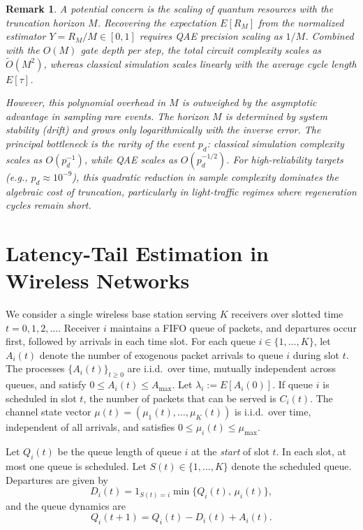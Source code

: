 \documentclass[11pt]{article}
\newcommand{\E}{E}
\newtheorem{remark}{Remark}
\begin{document}
\begin{remark}
A potential concern is the scaling of quantum resources with the truncation horizon $M$. Recovering the expectation $E[R_M]$ from the normalized estimator $Y=R_M/M \in [0,1]$ requires QAE precision scaling as $1/M$. Combined with the $O(M)$ gate depth per step, the total circuit complexity scales as $\tilde{O}(M^2)$, whereas classical simulation scales linearly with the average cycle length $E[\tau]$.

However, this polynomial overhead in $M$ is outweighed by the asymptotic advantage in sampling rare events. The horizon $M$ is determined by system stability (drift) and grows only logarithmically with the inverse error. The principal bottleneck is the rarity of the event $p_d$: classical simulation complexity scales as $O(p_d^{-1})$, while QAE scales as $O(p_d^{-1/2})$. For high-reliability targets (e.g., $p_d \approx 10^{-9}$), this quadratic reduction in sample complexity dominates the algebraic cost of truncation, particularly in light-traffic regimes where regeneration cycles remain short.
\end{remark}



\section{Latency-Tail Estimation in Wireless Networks}\label{sec:wireless}

We consider a single wireless base station serving $K$ receivers over slotted time
$t=0,1,2,\dots$.
Receiver $i$ maintains a FIFO queue of packets, and departures occur first,
followed by arrivals in each time slot.
For each queue $i\in\{1,\dots,K\}$, let $A_i(t)$ denote the number
of exogenous packet arrivals to queue $i$ during slot $t$.
The processes $\{A_i(t)\}_{t\ge 0}$ are i.i.d.\ over time, mutually independent across
queues, and satisfy
$
0 \le A_i(t) \le A_{\max}.
$
Let $\lambda_i := \E[A_i(0)]$.
If queue $i$ is scheduled in slot $t$, the number of packets that can be served is
$C_i(t)$.
The channel state vector $\mu(t)=(\mu_1(t),\dots,\mu_K(t))$ is i.i.d.\ over time,
independent of all arrivals, and satisfies
$
0 \le \mu_i(t) \le \mu_{\max}.
$

Let $Q_i(t)$ be the queue length of queue $i$ at the \emph{start} of slot $t$.
In each slot, at most one queue is scheduled.
Let $S(t)\in\{1,\dots,K\}$ denote the scheduled queue.
Departures are given by
\[
D_i(t)
=
1_{S(t)=i}\min\{Q_i(t),\,\mu_i(t)\},
\]
and the queue dynamics are
\[
Q_i(t+1) = Q_i(t) - D_i(t) + A_i(t).
\]
\end{document}
